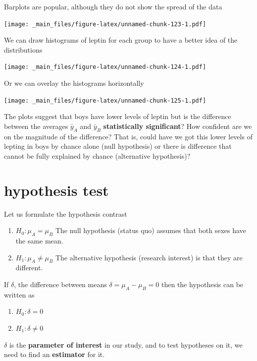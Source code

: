 \documentclass[
]{book}
\providecommand{\tightlist}{%
  \setlength{\itemsep}{0pt}\setlength{\parskip}{0pt}}
\begin{document}
Barplots are popular, although they do not show the spread of the data

\texttt{[image: \_main\_files/figure-latex/unnamed-chunk-123-1.pdf]}

We can draw histograms of leptin for each group to have a better idea of the distributions

\texttt{[image: \_main\_files/figure-latex/unnamed-chunk-124-1.pdf]}

Or we can overlay the histograms horizontally

\texttt{[image: \_main\_files/figure-latex/unnamed-chunk-125-1.pdf]}

The plots suggest that boys have lower levels of leptin but is the difference between the averages \(\bar{y}_A\) and \(\bar{y}_B\) \textbf{statistically significant}? How confident are we on the magnitude of the difference? That is, could have we got this lower levels of lepting in boys by chance alone (null hypothesis) or there is difference that cannot be fully explained by chance (alternative hypothesis)?

\hypertarget{hypothesis-test}{%
\section{hypothesis test}\label{hypothesis-test}}

Let us formulate the hypothesis contrast

\begin{enumerate}
\def\labelenumi{\alph{enumi}.}
\item
  \(H_0: \mu_A=\mu_B\) The null hypothesis (status quo) assumes that both sexes have the same mean.
\item
  \(H_1: \mu_A \neq \mu_B\) The alternative hypothesis (research interest) is that they are different.
\end{enumerate}

If \(\delta\), the difference between means \(\delta=\mu_A-\mu_B=0\) then the hypothesis can be written as

\begin{enumerate}
\def\labelenumi{\alph{enumi}.}
\tightlist
\item
  \(H_0: \delta=0\)
\item
  \(H_1: \delta\neq 0\)
\end{enumerate}

\(\delta\) is the \textbf{parameter of interest} in our study, and to test hypotheses on it, we need to find an \textbf{estimator} for it.
\end{document}
